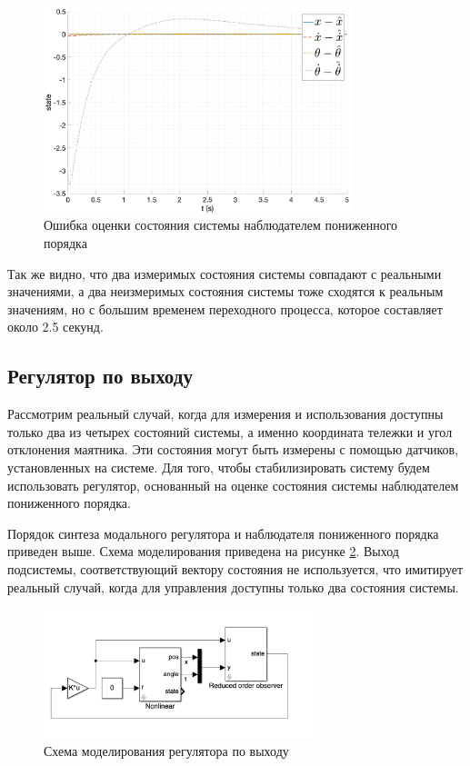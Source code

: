\begin{figure}[ht!]
    \centering
    \includegraphics[width=0.8\textwidth]{media/plots/reduced_observer/reduced_observer_err_2.png}
    \caption{Ошибка оценки состояния системы наблюдателем пониженного порядка}
    \label{fig:reduced_observer_err_2}
\end{figure}
\FloatBarrier
Так же видно, что два измеримых состояния системы совпадают с реальными значениями, а два
неизмеримых состояния системы тоже сходятся к реальным значениям, но с большим временем переходного процесса,
которое составляет около 2.5 секунд.


\subsection{Регулятор по выходу}
Рассмотрим реальный случай, когда для измерения и использования доступны только 
два из четырех состояний системы, а именно координата тележки и угол отклонения маятника.
Эти состояния могут быть измерены с помощью датчиков, установленных на системе. Для того, чтобы
стабилизировать систему будем использовать регулятор, основанный на оценке состояния системы 
наблюдателем пониженного порядка. 

Порядок синтеза модального регулятора и наблюдателя пониженного порядка приведен выше. 
Схема моделирования приведена на рисунке \ref{fig:modal_controller_obderver}.
Выход подсистемы, соответствующий вектору состояния не используется, что 
имитирует реальный случай, когда для управления доступны только два состояния системы. 

\begin{figure}[ht!]
    \centering
    \includegraphics[width=0.7\textwidth]{media/model_controller_observer.png}
    \caption{Схема моделирования регулятора по выходу}
    \label{fig:modal_controller_obderver}
\end{figure} 

